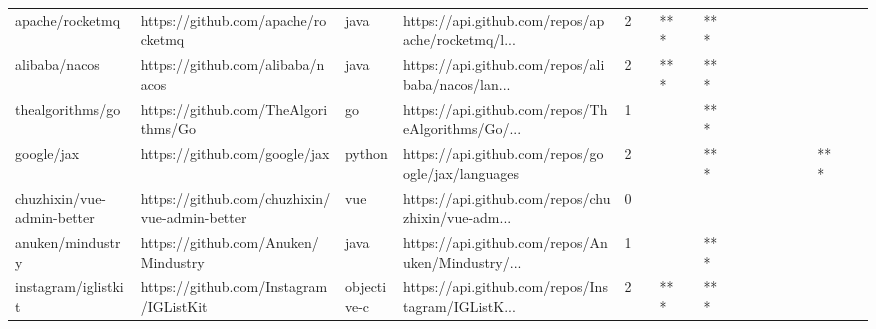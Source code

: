 \begin{tabular}{llllrlllllllllllll}
apache/rocketmq                                    &                 https://github.com/apache/rocketmq &              java &  https://api.github.com/repos/apache/rocketmq/l... &       2 &         &    *** &           &            *** &                 &        &           &           &          &          &       &              &          \\
alibaba/nacos                                      &                   https://github.com/alibaba/nacos &              java &  https://api.github.com/repos/alibaba/nacos/lan... &       2 &         &    *** &           &            *** &                 &        &           &           &          &          &       &              &          \\
thealgorithms/go                                   &                https://github.com/TheAlgorithms/Go &                go &  https://api.github.com/repos/TheAlgorithms/Go/... &       1 &         &        &           &            *** &                 &        &           &           &          &          &       &              &          \\
google/jax                                         &                      https://github.com/google/jax &            python &  https://api.github.com/repos/google/jax/languages &       2 &         &        &           &            *** &                 &        &           &           &          &          &   *** &              &          \\
chuzhixin/vue-admin-better                         &      https://github.com/chuzhixin/vue-admin-better &               vue &  https://api.github.com/repos/chuzhixin/vue-adm... &       0 &         &        &           &                &                 &        &           &           &          &          &       &              &          \\
anuken/mindustry                                   &                https://github.com/Anuken/Mindustry &              java &  https://api.github.com/repos/Anuken/Mindustry/... &       1 &         &        &           &            *** &                 &        &           &           &          &          &       &              &          \\
instagram/iglistkit                                &             https://github.com/Instagram/IGListKit &       objective-c &  https://api.github.com/repos/Instagram/IGListK... &       2 &         &    *** &           &            *** &                 &        &           &           &          &          &       &              &          \\

\end{tabular}
